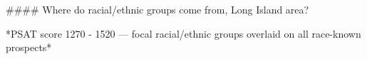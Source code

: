 #### Where do racial/ethnic groups come from, Long Island area?

*PSAT score 1270 - 1520 — focal racial/ethnic groups overlaid on all race-known prospects*
